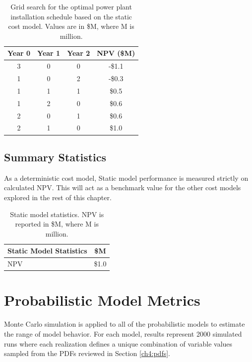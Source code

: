 \begin{table}[!htp]%
\centering
\begin{tabular}{|c|c|c|c|}
\hline
\textbf{Year 0} & \textbf{Year 1} & \textbf{Year 2} & \textbf{NPV (\$M)} \\ \hline
3 & 0 & 0 & -\$1.1 \\ \hline
1 & 0 & 2 & -\$0.3 \\ \hline
1 & 1 & 1 & \$0.5 \\ \hline
1 & 2 & 0 & \$0.6 \\ \hline
2 & 0 & 1 & \$0.6 \\ \hline
2 & 1 & 0 & \$1.0 \\ \hline
\end{tabular}
\caption[Static model module installation schedule]{Grid search for the optimal power plant installation schedule based on the static cost model. Values are in \$M, where M is million.}
\label{tab:static_optimization}
\end{table}

\subsection{Summary Statistics}
\label{ch6:static_stats}

As a deterministic cost model, Static model performance is measured strictly on calculated NPV. This will act as a benchmark value for the other cost models explored in the rest of this chapter.

\begin{table}[H]
\centering
\begin{tabular}{|l|c|}
\hline
\textbf{Static Model Statistics} & \textbf{\$M} \\ \hline
NPV & \$1.0 \\ \hline
\end{tabular}
\caption[Static model statistics]{Static model statistics. NPV is reported in \$M, where M is million.}
\label{tab:static_mod_stats}
\end{table}

\section{Probabilistic Model Metrics}

Monte Carlo simulation is applied to all of the probabilistic models to estimate the range of model behavior. For each model, results represent 2000 simulated runs where each realization defines a unique combination of variable values sampled from the PDFs reviewed in Section \ref{ch4:pdfs}. 

